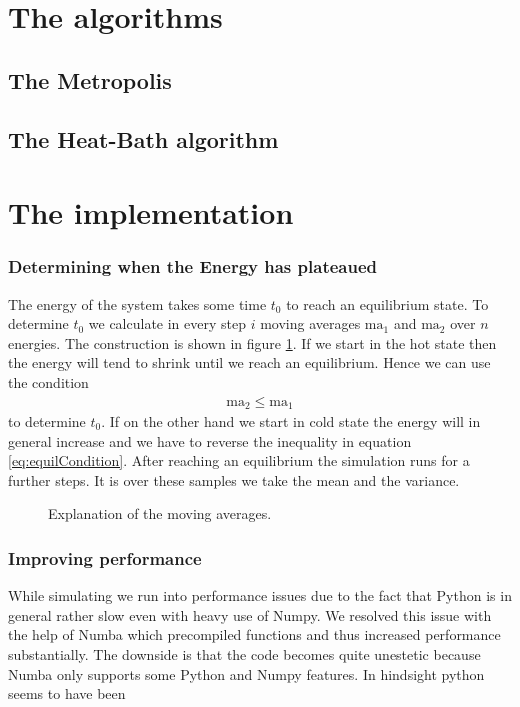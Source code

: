 \section{The algorithms}
\subsection{The Metropolis}


\subsection{The Heat-Bath algorithm}

\section{The implementation}

\subsubsection{Determining when the Energy has plateaued}

The energy of the system takes some time $t_0$ to reach an equilibrium state. To determine $t_0$ we calculate in every step $i$ moving averages $\text{ma}_1$ and $\text{ma}_2$ over $n$ energies. The construction is shown in figure \ref{fi:movingAverages}. If we start in the hot state then the energy will tend to shrink until we reach an equilibrium. Hence we can use the condition
\begin{align}
	\text{ma}_2 \leq \text{ma}_1 \label{eq:equilCondition}
\end{align}
to determine $t_0$. If on the other hand we start in cold state the energy will in general increase and we have to reverse the inequality in equation \eqref{eq:equilCondition}. After reaching an equilibrium the simulation runs for a further  steps. It is over these samples we take the mean and the variance.

\begin{figure}
\centering

\caption{Explanation of the moving averages.}
\label{fi:movingAverages}
\end{figure}

\subsubsection{Improving performance}
While simulating we run into performance issues due to the fact that Python is in general rather slow even with heavy use of Numpy. We resolved this issue with the help of Numba which precompiled functions and thus increased performance substantially. The downside is that the code becomes quite unestetic because Numba only supports some Python and Numpy features. In hindsight python seems to have been 

